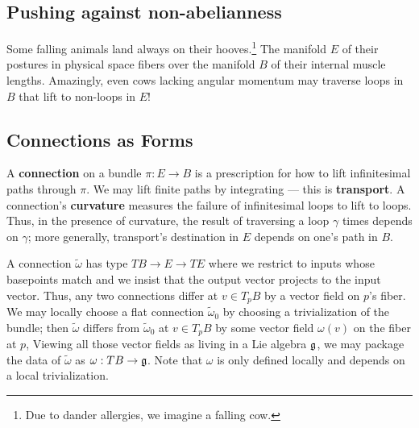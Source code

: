 \documentclass[twocolumn, 11pt]{article}
\newcommand{\gG}{\frak{g}}
\theoremstyle{definition}
\newcommand{\msec}[1]{\subsection*{\color{mblu}\textsf{#1}}}
\begin{document}

    \msec{Pushing against non-abelianness}
        Some falling animals land always on their hooves.\footnote{Due to dander
        allergies, we imagine a falling cow.}  The manifold $E$ of their
        postures in physical space fibers over the manifold
        $B$ of their internal muscle lengths.  Amazingly, even cows lacking
        angular momentum may traverse loops in $B$ that lift to non-loops in
        $E$!

    \msec{Connections as Forms}
        A \textbf{connection} on a bundle $\pi:E\to B$ is a prescription for
        how to lift infinitesimal paths through $\pi$.  We may lift finite
        paths by integrating --- this is \textbf{transport}.  A connection's
        \textbf{curvature} measures the failure of infinitesimal loops to lift
        to loops.  Thus, in the presence of curvature, the result of traversing
        a loop $\gamma$ times depends on $\gamma$; more generally, transport's
        destination in $E$ depends on one's path in $B$.

        A connection $\tilde\omega$ has type $TB \to E \to TE$ where we restrict
        to inputs whose basepoints match and we insist that the output vector
        projects to the input vector.
        Thus, any two connections differ at $v \in T_p B$ by a vector field  on
        $p$'s fiber.  We may locally choose a flat connection $\tilde\omega_0$
        by choosing a trivialization of the bundle; then $\tilde\omega$ differs
        from $\tilde\omega_0$ at $v\in T_p B$ by some vector field $\omega(v)$
        on the fiber at $p$, Viewing all those vector fields as living in a Lie
        algebra $\gG$, we may package the data of $\tilde\omega$ as $\omega:TB
        \to \gG$.  Note that $\omega$ is only defined locally and depends on a
        local trivialization.
\end{document}
